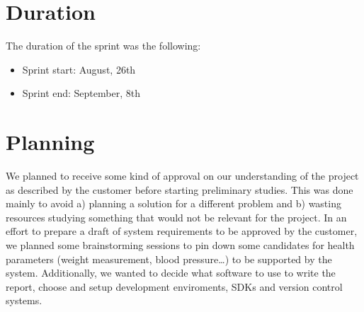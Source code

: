 \section{Duration}
The duration of the sprint was the following:
\begin{itemize}
\item Sprint start: August, 26th
\item Sprint end: September, 8th
\end{itemize}

\section{Planning}

We planned to receive some kind of approval on our understanding of the project
as described by the customer before starting preliminary studies. This was done mainly to avoid
a) planning a solution for a different problem and
b) wasting resources studying something that would not be relevant for the project.
In an effort to prepare a draft of system requirements to be approved by the customer,
we planned some brainstorming sessions to pin down some candidates for health parameters
(weight measurement, blood pressure\ldots) to be supported by the system.
Additionally, we wanted to decide what software to use to write the report,
choose and setup development enviroments, SDKs and version control systems.


